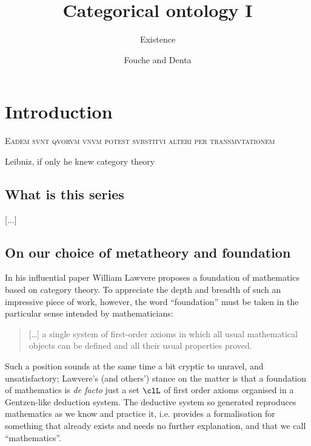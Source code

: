 \documentclass{amsart}
\author{Fouche and Denta}
\title{Categorical ontology I}
\subtitle{Existence}
\begin{document}
\maketitle
\begin{abstract}

\end{abstract}
\section{Introduction}
\epigraph{\textsc{Eadem svnt qvorvm vnvm potest svbstitvi alteri per transmvtationem}}{Leibniz, if only he knew category theory}
\subsection{What is this series}
[...]
\subsection{On our choice of metatheory and foundation}
In his influential paper \cite{} William Lawvere proposes a foundation of mathematics based on category theory. To appreciate the depth and breadth of such an impressive piece of work, however, the word ``foundation'' must be taken in the particular sense intended by mathematicians:
\begin{quote}
  [\dots\unkern] a single system of first-order axioms in which all usual mathematical objects can be defined and all their usual properties proved.
\end{quote}
Such a position sounds at the same time a bit cryptic to unravel, and unsatisfactory; Lawvere's (and others') stance on the matter is that a foundation of mathematics is \emph{de facto} just a set $\clL$ of first order axioms organised in a Gentzen-like deduction system. The deductive system so generated reproduces mathematics as we know and practice it, i.e. provides a formalisation for something that already exists and needs no further explanation, and that we call ``mathematics''.
\end{document}
